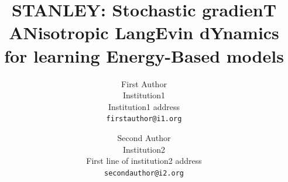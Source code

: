 \documentclass[10pt,twocolumn,letterpaper]{article}
\begin{document}
\title{STANLEY: \textbf{S}tochastic gradien\textbf{T} \textbf{AN}isotropic \textbf{L}ang\textbf{E}vin d\textbf{Y}namics for learning Energy-Based models}

\author{First Author\\
Institution1\\
Institution1 address\\
{\tt\small firstauthor@i1.org}
\and
Second Author\\
Institution2\\
First line of institution2 address\\
{\tt\small secondauthor@i2.org}
}



\maketitle
\ificcvfinal\thispagestyle{empty}\fi
\end{document}
